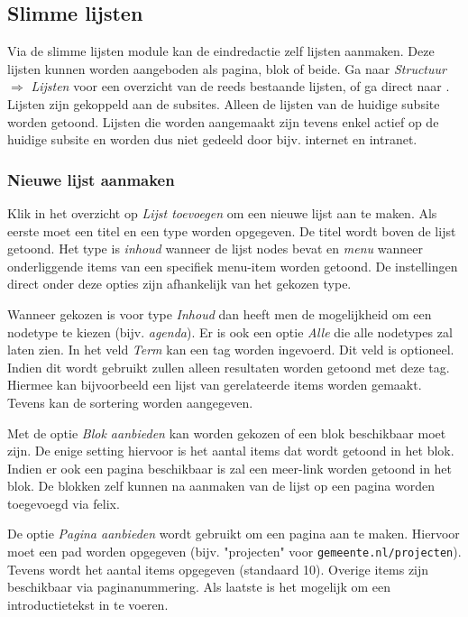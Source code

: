 \subsection{Slimme lijsten}\label{slimmelijsten}

Via de slimme lijsten module kan de eindredactie zelf lijsten aanmaken. Deze lijsten kunnen worden aangeboden als pagina, blok of beide.
Ga naar \emph{Structuur} $\Rightarrow$ \emph{Lijsten} voor een overzicht van de reeds bestaande lijsten, of ga direct naar .
Lijsten zijn gekoppeld aan de subsites. Alleen de lijsten van de huidige subsite worden getoond. Lijsten die worden aangemaakt zijn tevens enkel actief op de huidige subsite en worden dus niet gedeeld door bijv. internet en intranet.

\subsubsection{Nieuwe lijst aanmaken}

Klik in het overzicht op \emph{Lijst toevoegen} om een nieuwe lijst aan te maken. Als eerste moet een titel en een type worden opgegeven. De titel wordt boven de lijst getoond. Het type is \emph{inhoud} wanneer de lijst nodes bevat en \emph{menu} wanneer onderliggende items van een specifiek menu-item worden getoond. De instellingen direct onder deze opties zijn afhankelijk van het gekozen type.

Wanneer gekozen is voor type \emph{Inhoud} dan heeft men de mogelijkheid om een nodetype te kiezen (bijv. \emph{agenda}). Er is ook een optie \emph{Alle} die alle nodetypes zal laten zien.
In het veld \emph{Term} kan een tag worden ingevoerd. Dit veld is optioneel. Indien dit wordt gebruikt zullen alleen resultaten worden getoond met deze tag. Hiermee kan bijvoorbeeld een lijst van gerelateerde items worden gemaakt. Tevens kan de sortering worden aangegeven.

Met de optie \emph{Blok aanbieden} kan worden gekozen of een blok beschikbaar moet zijn. De enige setting hiervoor is het aantal items dat wordt getoond in het blok. Indien er ook een pagina beschikbaar is zal een meer-link worden getoond in het blok. De blokken zelf kunnen na aanmaken van de lijst op een pagina worden toegevoegd via felix.

De optie \emph{Pagina aanbieden} wordt gebruikt om een pagina aan te maken. Hiervoor moet een pad worden opgegeven (bijv. "projecten" voor \texttt{gemeente.nl/projecten}). Tevens wordt het aantal items opgegeven (standaard 10). Overige items zijn beschikbaar via paginanummering. Als laatste is het mogelijk om een introductietekst in te voeren.